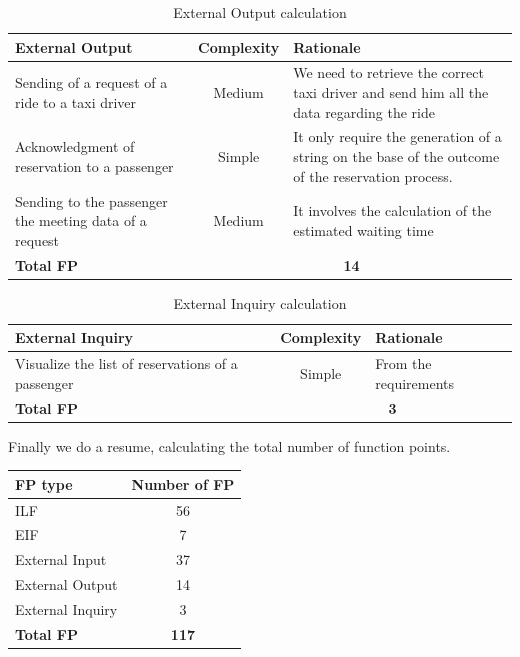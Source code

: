 \begin{table}[H]
\centering
\begin{tabular}{ p{} | c | p{} }
\textbf{External Output} & \textbf{Complexity} & \textbf{Rationale} \\ \hline
Sending of a request of a ride to a taxi driver & Medium & We need to retrieve the correct taxi driver and send him all the data regarding the ride \\ \hline
Acknowledgment of reservation to a passenger & Simple & It only require the generation of a string on the base of the outcome of the reservation process. \\ \hline
Sending to the passenger the meeting data of a request & Medium & It involves the calculation of the estimated waiting time \\ \hline
\textbf{Total FP} & \multicolumn{2}{c}{\textbf{14}}
\end{tabular}
\caption{External Output calculation}
\end{table}

\begin{table}[H]
\centering
\begin{tabular}{ p{} | c | p{} }
\textbf{External Inquiry} & \textbf{Complexity} & \textbf{Rationale} \\ \hline
Visualize the list of reservations of a passenger & Simple & From the requirements \\ \hline
\textbf{Total FP} & \multicolumn{2}{c}{\textbf{3}}
\end{tabular}
\caption{External Inquiry calculation}
\end{table}
Finally we do a resume, calculating the total number of function points.
\begin{table}[H]
\centering
\begin{tabular}{ l | c }
\textbf{FP type} & \textbf{Number of FP} \\ \hline
ILF & 56 \\ \hline
EIF & 7 \\ \hline
External Input & 37 \\ \hline
External Output & 14 \\ \hline
External Inquiry & 3 \\ \hline
{\large \textbf{Total FP}} & {\large \textbf{117}}
\end{tabular}
\end{table}
